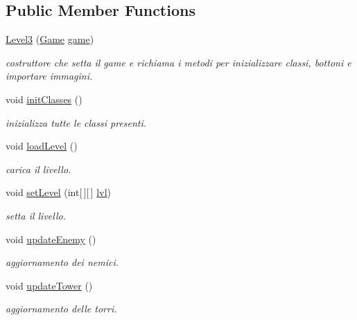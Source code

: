 \subsection*{Public Member Functions}
\begin{DoxyCompactItemize}
\item 
\hyperlink{classscenes_1_1_level3_a0f56949b20e6eda500c5b9c50e16de58}{Level3} (\hyperlink{classprogetto_1_1_game}{Game} \hyperlink{classscenes_1_1_game_scene_ac6a5ed6191fcf3a5bf0445921feb4f48}{game})
\begin{DoxyCompactList}\small\item\em costruttore che setta il game e richiama i metodi per inizializzare classi, bottoni e importare immagini. \end{DoxyCompactList}\item 
void \hyperlink{classscenes_1_1_level3_afe125d345675ffefe8da7e96d39773f3}{init\+Classes} ()
\begin{DoxyCompactList}\small\item\em inizializza tutte le classi presenti. \end{DoxyCompactList}\item 
void \hyperlink{classscenes_1_1_level3_a286931cc46e197f4a85af7229fdc29a4}{load\+Level} ()
\begin{DoxyCompactList}\small\item\em carica il livello. \end{DoxyCompactList}\item 
void \hyperlink{classscenes_1_1_level3_afdd7363804bf6696ce4a46d6448844ed}{set\+Level} (int\mbox{[}$\,$\mbox{]}\mbox{[}$\,$\mbox{]} \hyperlink{classscenes_1_1_level3_a4b06a2210cf5b93dda77f2a9a061d538}{lvl})
\begin{DoxyCompactList}\small\item\em setta il livello. \end{DoxyCompactList}\item 
void \hyperlink{classscenes_1_1_level3_af005ec68c869a6acd5e833cba9330a50}{update\+Enemy} ()
\begin{DoxyCompactList}\small\item\em aggiornamento dei nemici. \end{DoxyCompactList}\item 
void \hyperlink{classscenes_1_1_level3_ae4fd4a959e4d782a5e7ac0eff77ba27f}{update\+Tower} ()
\begin{DoxyCompactList}\small\item\em aggiornamento delle torri. \end{DoxyCompactList}\item 

\end{DoxyCompactItemize}
